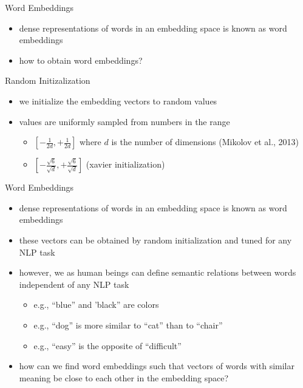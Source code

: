 \documentclass[12pt, handout]{beamer}
\begin{document}
\begin{frame}{Word Embeddings}
	\begin{itemize}
		\item dense representations of words in an embedding space is known as word embeddings
		\item how to obtain word embeddings?  
	\end{itemize}
\end{frame}
\begin{frame}{Random Initizalization}
	\begin{itemize}
		\item<1-> we initialize the embedding vectors to random values
		\item<2-> values are uniformly sampled from numbers in the range
		\begin{itemize}
			\item<3->  $[-\frac{1}{2d}, +\frac{1}{2d} ] $ where $d$ is the number of dimensions (Mikolov et al., 2013)
			\item<4->  $[-\frac{\sqrt{6}}{\sqrt{d}}, +\frac{\sqrt{6}}{\sqrt{d}} ] $ (xavier initialization)
		\end{itemize}
	\end{itemize}
\end{frame}
\begin{frame}{Word Embeddings}
	\begin{itemize}
		\item<1-> dense representations of words in an embedding space is known as word embeddings
		\item<2-> these vectors can be obtained by random initialization and tuned for any NLP task
		\item<3-> however, we as human beings can define semantic relations between words independent of any NLP task
		\begin{itemize}
			\item e.g., ``blue'' and  'black'' are colors
			\item e.g., ``dog'' is more similar to ``cat'' than to ``chair'' 
			\item e.g., ``easy'' is the opposite of ``difficult''
		\end{itemize}
		\item<4-> how can we find word embeddings such that vectors of words with similar meaning be close to each other in the embedding space?
	\end{itemize}
\end{frame}
\end{document}
